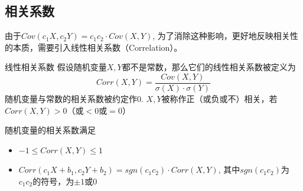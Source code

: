 
\subsection{相关系数}


\begin{frame}

由于$Cov(c_1X, c_2Y) = c_1c_2\cdot Cov(X,Y)$, 为了消除这种影响，更好地反映相关性的本质，需要引入线性相关系数（Correlation）。

\vspace{1em}
\pause

\begin{block}{线性相关系数}
假设随机变量$X,Y$都不是常数，那么它们的线性相关系数被定义为
$$Corr(X,Y) = \dfrac{Cov(X, Y)}{\sigma(X)\cdot\sigma(Y)}$$
随机变量与常数的相关系数被约定作0. $X,Y$被称作正（或负或不）相关，若$Corr(X,Y) > 0$（或$<0$或$=0$）

\vspace{1em}
\pause

随机变量的相关系数满足
\begin{itemize}
\item $-1\le Corr(X,Y) \le 1$
\item $Corr(c_1X+b_1, c_2Y+b_2) = sgn(c_1c_2) \cdot Corr(X,Y)$, 其中$sgn(c_1c_2)$为$c_1c_2$的符号，为$\pm1$或0
\end{itemize}
\end{block}

\end{frame}



